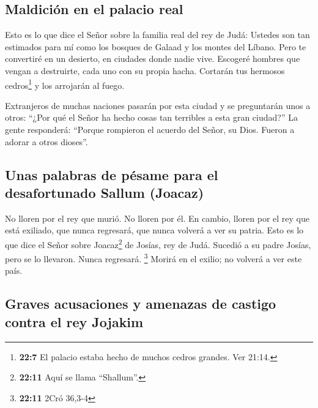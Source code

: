 \hypertarget{maldiciuxf3n-en-el-palacio-real}{%
\subsection{Maldición en el palacio
real}\label{maldiciuxf3n-en-el-palacio-real}}

 Esto es lo que dice el Señor sobre la familia real del
rey de Judá: Ustedes son tan estimados para mí como los bosques de
Galaad y los montes del Líbano. Pero te convertiré en un desierto, en
ciudades donde nadie vive.  Escogeré hombres que vengan a
destruirte, cada uno con su propia hacha. Cortarán tus hermosos
cedros\footnote{\textbf{22:7} El palacio estaba hecho de muchos cedros
  grandes. Ver 21:14.} y los arrojarán al fuego.

 Extranjeros de muchas naciones pasarán por esta ciudad y
se preguntarán unos a otros: ``¿Por qué el Señor ha hecho cosas tan
terribles a esta gran ciudad?''  La gente responderá:
``Porque rompieron el acuerdo del Señor, su Dios. Fueron a adorar a
otros dioses''.

\hypertarget{unas-palabras-de-puxe9same-para-el-desafortunado-sallum-joacaz}{%
\subsection{Unas palabras de pésame para el desafortunado Sallum
(Joacaz)}\label{unas-palabras-de-puxe9same-para-el-desafortunado-sallum-joacaz}}

 No lloren por el rey que murió. No lloren por él. En
cambio, lloren por el rey que está exiliado, que nunca regresará, que
nunca volverá a ver su patria.  Esto es lo que dice el
Señor sobre Joacaz\footnote{\textbf{22:11} Aquí se llama ``Shallum''.}
de Josías, rey de Judá. Sucedió a su padre Josías, pero se lo llevaron.
Nunca regresará. \footnote{\textbf{22:11} 2Cró 36,3-4} 
Morirá en el exilio; no volverá a ver este país.

\hypertarget{graves-acusaciones-y-amenazas-de-castigo-contra-el-rey-jojakim}{%
\subsection{Graves acusaciones y amenazas de castigo contra el rey
Jojakim}\label{graves-acusaciones-y-amenazas-de-castigo-contra-el-rey-jojakim}}

